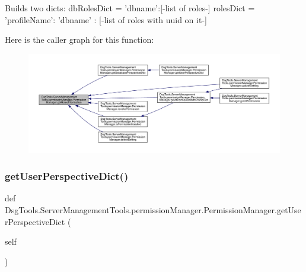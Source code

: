 \begin{DoxyVerb}Builds two dicts:
dbRolesDict = { 'dbname':[-list of roles-] }
rolesDict = { 'profileName': { 'dbname' : [-list of roles with uuid on it-] } }
\end{DoxyVerb}
 Here is the caller graph for this function\+:
\nopagebreak
\begin{figure}[H]
\begin{center}
\leavevmode
\includegraphics[width=350pt]{class_dsg_tools_1_1_server_management_tools_1_1permission_manager_1_1_permission_manager_a164d75a558e236cd4c76cb0c451d513a_icgraph}
\end{center}
\end{figure}
\mbox{\label{class_dsg_tools_1_1_server_management_tools_1_1permission_manager_1_1_permission_manager_acfa6084229b7e956dc6d3acaf77c99a7}} 
\subsubsection{\texorpdfstring{get\+User\+Perspective\+Dict()}{getUserPerspectiveDict()}}
{\footnotesize\ttfamily def Dsg\+Tools.\+Server\+Management\+Tools.\+permission\+Manager.\+Permission\+Manager.\+get\+User\+Perspective\+Dict (\begin{DoxyParamCaption}\item[{}]{self }\end{DoxyParamCaption})}

